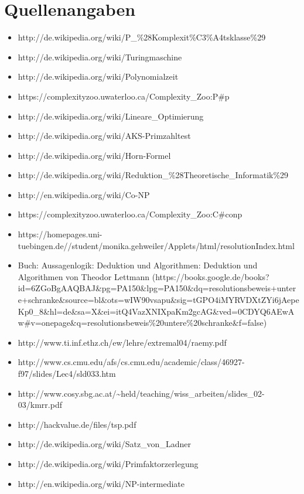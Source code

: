 \documentclass[ignorenonframetext,]{beamer}
\begin{document}
\section{Quellenangaben}\label{quellenangaben}

\begin{frame}

\begin{itemize}
\itemsep1pt\parskip0pt
\item
  http://de.wikipedia.org/wiki/P\_\%28Komplexit\%C3\%A4tsklasse\%29
\item
  http://de.wikipedia.org/wiki/Turingmaschine
\item
  http://de.wikipedia.org/wiki/Polynomialzeit
\item
  https://complexityzoo.uwaterloo.ca/Complexity\_Zoo:P\#p
\item
  http://de.wikipedia.org/wiki/Lineare\_Optimierung
\item
  http://de.wikipedia.org/wiki/AKS-Primzahltest
\item
  http://de.wikipedia.org/wiki/Horn-Formel
\item
  http://de.wikipedia.org/wiki/Reduktion\_\%28Theoretische\_Informatik\%29
\item
  http://en.wikipedia.org/wiki/Co-NP
\item
  https://complexityzoo.uwaterloo.ca/Complexity\_Zoo:C\#conp
\item
  https://homepages.uni-tuebingen.de//student/monika.gehweiler/Applets/html/resolutionIndex.html
\end{itemize}

\end{frame}

\begin{frame}

\begin{itemize}
\itemsep1pt\parskip0pt
\item
  Buch: Aussagenlogik: Deduktion und Algorithmen: Deduktion und
  Algorithmen von Theodor Lettmann
  (https://books.google.de/books?id=6ZGoBgAAQBAJ\&pg=PA150\&lpg=PA150\&dq=resolutionsbeweis+untere+schranke\&source=bl\&ots=wIW90vsapu\&sig=tGPO4iMYRVDXtZYi6jAepeKp0\_8\&hl=de\&sa=X\&ei=itQ4VazXNIXpaKm2gcAG\&ved=0CDYQ6AEwAw\#v=onepage\&q=resolutionsbeweis\%20untere\%20schranke\&f=false)
\item
  http://www.ti.inf.ethz.ch/ew/lehre/extremal04/raemy.pdf
\item
  http://www.cs.cmu.edu/afs/cs.cmu.edu/academic/class/46927-f97/slides/Lec4/sld033.htm
\item
  http://www.cosy.sbg.ac.at/\textasciitilde{}held/teaching/wiss\_arbeiten/slides\_02-03/kmrr.pdf
\item
  http://hackvalue.de/files/tsp.pdf
\item
  http://de.wikipedia.org/wiki/Satz\_von\_Ladner
\item
  http://de.wikipedia.org/wiki/Primfaktorzerlegung
\item
  http://en.wikipedia.org/wiki/NP-intermediate
\end{itemize}

\end{frame}
\end{document}
